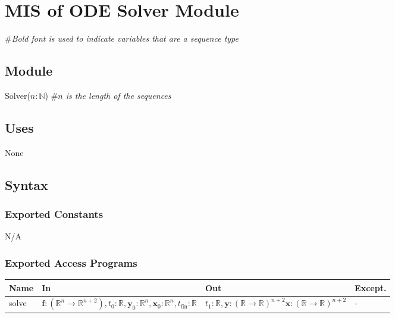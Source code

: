 \documentclass[12pt, titlepage]{article}
\begin{document}
\begin{comment}
\subsubsection{Local Functions}

N/A

\newpage
\end{comment}

\section{MIS of ODE Solver Module} \label{ODEModule} 
\#\textit{Bold font is used to indicate variables that are a sequence
  type} 
\subsection{Module}
Solver($n: \mathbb{N}$) \#\textit{$n$ is the length of the sequences}

\subsection{Uses}
None

\subsection{Syntax}

\subsubsection{Exported Constants}
N/A
\subsubsection{Exported Access Programs}

\begin{center}
\begin{tabular}{p{1.5cm} >{\raggedright\arraybackslash}p{9.25cm} >{\raggedright\arraybackslash}p{2.4cm} p{1.5cm}}
  \hline
  \textbf{Name} & \textbf{In} & \textbf{Out} & \textbf{Except.} \\
  \hline
  solve & $\textbf{f}: (\mathbb{R}^{n} \rightarrow \mathbb{R}^{n+2}), t_0 : \mathbb{R},
          \textbf{y}_0: \mathbb{R}^n, \textbf{x}_0: \mathbb{R}^n, 
          t_\text{fin}: \mathbb{R}$ & $t_1: \mathbb{R}, 
                                      \textbf{y}:
                                      (\mathbb{R}
                                      \rightarrow
                                      \mathbb{R})^{n+2} \textbf{x}:
                                      (\mathbb{R}
                                      \rightarrow
                                      \mathbb{R})^{n+2}$ & -\\

  \hline 
\end{tabular}
\end{center}
\end{document}
